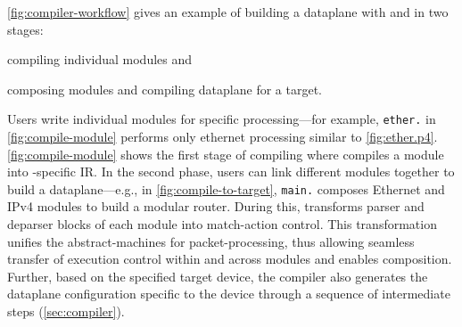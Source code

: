 \documentclass[letterpaper,twocolumn,10pt]{article}
\begin{document}
\cref{fig:compiler-workflow} gives an example of building a dataplane
with \ulang and \ucomp in two stages:
\begin{enumerate*}[label=(\roman*)]
  \item compiling individual modules and
  \item composing modules and compiling dataplane for a target.
\end{enumerate*}
Users write individual modules for specific processing---for example,
\texttt{ether.\ulang} in \cref{fig:compile-module} performs only
ethernet processing similar to \cref{fig:ether.p4}.
\cref{fig:compile-module} shows the first stage of compiling where
\ucomp compiles a module into \uarch-specific IR.   In the second
phase, users can link different modules together to build a
dataplane---e.g., in \cref{fig:compile-to-target},
\texttt{main.\ulang} composes Ethernet and IPv4 modules to build a
modular router. During this, \ucomp transforms parser and deparser
blocks of each module into match-action control. This transformation
unifies the abstract-machines for packet-processing, thus allowing
seamless transfer of execution control within and across modules and
enables composition. Further, based on the specified target device,
the compiler also generates the dataplane configuration specific to
the device through a sequence of intermediate steps
(\cref{sec:compiler}).
\end{document}
